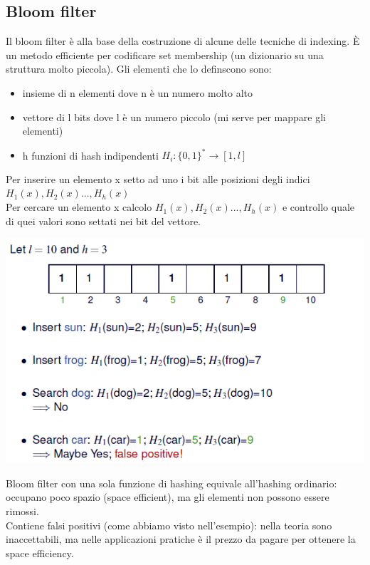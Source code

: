 \subsection{Bloom filter}
Il bloom filter è alla base della costruzione di alcune delle tecniche di indexing. È un metodo efficiente per codificare set membership (un dizionario su una struttura molto piccola). Gli elementi che lo definscono sono:
\begin{itemize}
    \item insieme di n elementi dove n è un numero molto alto
    \item vettore di l bits dove l è un numero piccolo (mi serve per mappare gli elementi)
    \item h funzioni di hash indipendenti \(H_i : \{0,1\}^* \rightarrow [1,l]\)
\end{itemize}
Per inserire un elemento x setto ad uno i bit alle posizioni degli indici \(H_1(x), H_2(x)..., H_h(x)\)\\
Per cercare un elemento x calcolo \(H_1(x), H_2(x)..., H_h(x)\) e controllo quale di quei valori sono settati nei bit del vettore.
\begin{center}
    \includegraphics[scale=0.6]{img/bloomfliter.png}
\end{center}
Bloom filter con una sola funzione di hashing equivale all'hashing ordinario: occupano poco spazio (space efficient), ma gli elementi non possono essere rimossi.\\
Contiene falsi positivi (come abbiamo visto nell'esempio): nella teoria sono inaccettabili, ma nelle applicazioni pratiche è il prezzo da pagare per ottenere la space efficiency.

